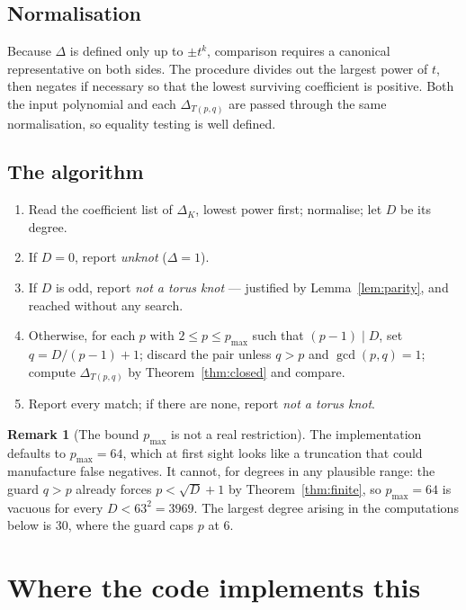 \documentclass[11pt]{article}
\theoremstyle{definition}
\newtheorem{remark}[theorem]{Remark}
\newcommand{\Deltaa}{\Delta}
\newcommand{\T}[2]{T(#1,#2)}
\begin{document}
\subsection{Normalisation}

Because $\Deltaa$ is defined only up to $\pm t^{k}$, comparison requires a canonical
representative on both sides. The procedure divides out the largest power of $t$, then
negates if necessary so that the lowest surviving coefficient is positive. Both the
input polynomial and each $\Deltaa_{\T{p}{q}}$ are passed through the same
normalisation, so equality testing is well defined.

\subsection{The algorithm}

\begin{enumerate}
\item Read the coefficient list of $\Deltaa_{K}$, lowest power first; normalise; let
$D$ be its degree.
\item If $D=0$, report \emph{unknot} ($\Deltaa=1$).
\item If $D$ is odd, report \emph{not a torus knot} --- justified by
Lemma~\ref{lem:parity}, and reached without any search.
\item Otherwise, for each $p$ with $2\le p\le p_{\max}$ such that $(p-1)\mid D$, set
$q = D/(p-1)+1$; discard the pair unless $q>p$ and $\gcd(p,q)=1$; compute
$\Deltaa_{\T{p}{q}}$ by Theorem~\ref{thm:closed} and compare.
\item Report every match; if there are none, report \emph{not a torus knot}.
\end{enumerate}

\begin{remark}[The bound $p_{\max}$ is not a real restriction]
The implementation defaults to $p_{\max}=64$, which at first sight looks like a
truncation that could manufacture false negatives. It cannot, for degrees in any
plausible range: the guard $q>p$ already forces $p<\sqrt{D}+1$ by
Theorem~\ref{thm:finite}, so $p_{\max}=64$ is vacuous for every $D<63^{2}=3969$. The
largest degree arising in the computations below is $30$, where the guard caps $p$ at
$6$.
\end{remark}

\section{Where the code implements this}
\end{document}
